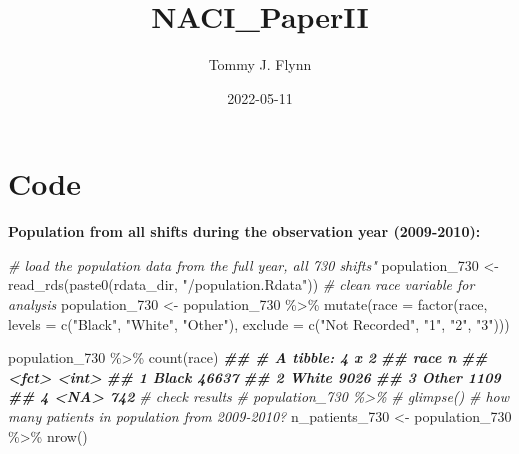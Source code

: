 \documentclass[
]{article}
\title{NACI\_PaperII}
\author{Tommy J. Flynn}
\date{2022-05-11}
\newenvironment{Shaded}{\begin{snugshade}}{\end{snugshade}}
\newcommand{\AttributeTok}[1]{\textcolor[rgb]{0.77,0.63,0.00}{#1}}
\newcommand{\CommentTok}[1]{\textcolor[rgb]{0.56,0.35,0.01}{\textit{#1}}}
\newcommand{\DocumentationTok}[1]{\textcolor[rgb]{0.56,0.35,0.01}{\textbf{\textit{#1}}}}
\newcommand{\FunctionTok}[1]{\textcolor[rgb]{0.00,0.00,0.00}{#1}}
\newcommand{\NormalTok}[1]{#1}
\newcommand{\OtherTok}[1]{\textcolor[rgb]{0.56,0.35,0.01}{#1}}
\newcommand{\SpecialCharTok}[1]{\textcolor[rgb]{0.00,0.00,0.00}{#1}}
\newcommand{\StringTok}[1]{\textcolor[rgb]{0.31,0.60,0.02}{#1}}
\begin{document}
\maketitle

\hypertarget{code}{%
\section{Code}\label{code}}

\textbf{Population from all shifts during the observation year
(2009-2010):}

\begin{Shaded}
\begin{Highlighting}[]
\CommentTok{\# load the population data from the full year, all 730 shifts"}
\NormalTok{population\_730 }\OtherTok{\textless{}{-}} \FunctionTok{read\_rds}\NormalTok{(}\FunctionTok{paste0}\NormalTok{(rdata\_dir, }\StringTok{"/population.Rdata"}\NormalTok{))}
\CommentTok{\# clean race variable for analysis}
\NormalTok{population\_730 }\OtherTok{\textless{}{-}}\NormalTok{ population\_730 }\SpecialCharTok{\%\textgreater{}\%}
  \FunctionTok{mutate}\NormalTok{(}\AttributeTok{race =} \FunctionTok{factor}\NormalTok{(race,}
              \AttributeTok{levels =} \FunctionTok{c}\NormalTok{(}\StringTok{"Black"}\NormalTok{,}
                         \StringTok{"White"}\NormalTok{,}
                         \StringTok{"Other"}\NormalTok{),}
              \AttributeTok{exclude =} \FunctionTok{c}\NormalTok{(}\StringTok{"Not Recorded"}\NormalTok{, }\StringTok{"1"}\NormalTok{, }\StringTok{"2"}\NormalTok{, }\StringTok{"3"}\NormalTok{)))}

\NormalTok{population\_730 }\SpecialCharTok{\%\textgreater{}\%}
    \FunctionTok{count}\NormalTok{(race)}
\DocumentationTok{\#\# \# A tibble: 4 x 2}
\DocumentationTok{\#\#   race      n}
\DocumentationTok{\#\#   \textless{}fct\textgreater{} \textless{}int\textgreater{}}
\DocumentationTok{\#\# 1 Black 46637}
\DocumentationTok{\#\# 2 White  9026}
\DocumentationTok{\#\# 3 Other  1109}
\DocumentationTok{\#\# 4 \textless{}NA\textgreater{}    742}
\CommentTok{\# check results}
\CommentTok{\# population\_730 \%\textgreater{}\% }
  \CommentTok{\# glimpse()}
\CommentTok{\# how many patients in population from 2009{-}2010?}
\NormalTok{n\_patients\_730 }\OtherTok{\textless{}{-}}\NormalTok{ population\_730 }\SpecialCharTok{\%\textgreater{}\%}
  \FunctionTok{nrow}\NormalTok{()}
\end{Highlighting}
\end{Shaded}
\end{document}
